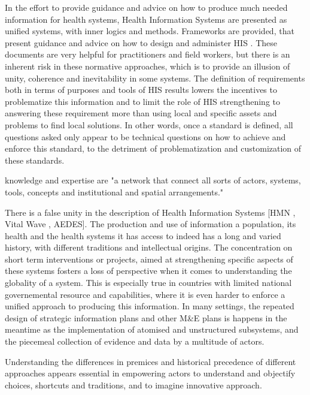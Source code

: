 \documentclass[letterpaper, 10 pt, conference]{ieeeconf}  %
\begin{document}
In the effort to provide guidance and advice on how to produce much needed information for health systems, Health Information Systems are presented as unified systems, with inner logics and methods. Frameworks are provided, that present guidance and advice on how to design and administer HIS \cite{health_metrics_network_framework_2008}. These documents are very helpful for practitioners and field workers, but there is an inherent risk in these normative approaches, which is to provide an illusion of unity, coherence and inevitability in some systems. The definition of requirements both in terms of purposes and tools of HIS results lowers the incentives to problematize this information and to limit the role of HIS strengthening to answering these requirement more than using local and specific assets and problems to find local solutions. In other words, once a standard is defined, all questions asked only appear to be technical questions on how to achieve and enforce this standard, to the detriment of problematization and customization of these standards.

knowledge and expertise are "a network that connect all sorts of actors, systems, tools, concepts and institutional and spatial arrangements." \cite{bergeron_savoirs_2014}


There is a false unity in the description of Health Information Systems [HMN , Vital Wave , AEDES]. The production and use of information a population, its health and the health systems it has access to indeed has a long and varied history, with different traditions and intellectual origins. The concentration on short term interventions or projects, aimed at strengthening specific aspects of these systems fosters a loss of perspective when it comes to understanding the globality of a system. This is especially true in countries with limited national governemental resource and capabilities, where it is even harder to enforce a unified approach to producing this information. In many settings, the repeated design of strategic information plans and other M\&E plans is happens in the meantime as the implementation of atomised and unstructured subsystems, and the piecemeal collection of  evidence and data by a multitude of actors.

Understanding the differences in premices and historical precedence of different approaches appears essential in empowering actors to understand and objectify choices, shortcuts and traditions, and to imagine innovative approach.
\end{document}
